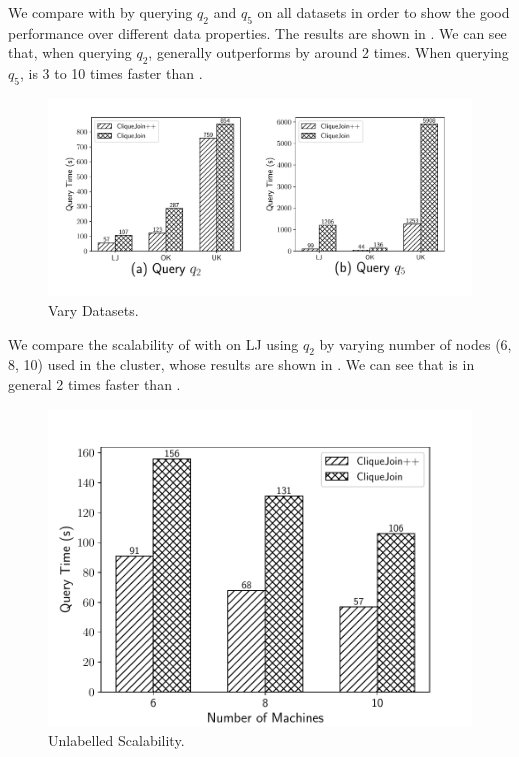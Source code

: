  We compare \gencliqjoin with \cliquejoin by querying $q_2$ and $q_5$ on all datasets in order to show the good performance over different data properties. The results are shown in . We can see that, when querying $q_2$, \gencliqjoin generally outperforms \cliquejoin by around 2 times. When querying $q_5$, \gencliqjoin is 3 to 10 times faster than \cliquejoin. 

\begin{figure}[htb]
  \flushleft
  \includegraphics[scale=0.35]{figures/exp2.pdf}
  \caption{\small{Vary Datasets.}}
  \label{fig:vary_dataset}
\end{figure}


 We compare the scalability of \gencliqjoin with \cliquejoin on LJ using $q_2$ by varying number of nodes (6, 8, 10) used in the cluster, whose results are shown in . We can see that \gencliqjoin is in general 2 times faster than \cliquejoin.

\begin{figure}[htb]
  \centering
  \includegraphics[scale=0.37]{figures/exp3.pdf}
  \caption{\small{Unlabelled Scalability.}}
  \label{fig:unl_sca}
\end{figure}


